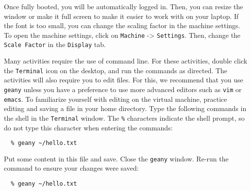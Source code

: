 \documentclass[11pt]{article}
\begin{document}
Once fully booted, you will be automatically logged in. Then, you can
resize the window or make it full screen to make it easier to work with
on your laptop. If the font is too small, you can change the scaling factor
in the machine settings. To open the machine settings, click on
\texttt{Machine} -> \texttt{Settings}. Then, change the \texttt{Scale Factor}
in the \texttt{Display} tab.

Many activities require the use of command line. For these
activities, double click the \texttt{Terminal} icon on the desktop, and run
the commands as directed. The activities will also require you to edit files.
For this, we recommend that you use \texttt{geany} unless you have a
preference to use more advanced editors such as \texttt{vim} or
\texttt{emacs}. To familiarize yourself with editing on the virtual machine,
practice editing and saving a file in your home directory. Type the
following commands in the shell in the \texttt{Terminal} window. The
\texttt{\%} characters indicate the shell prompt, so do not type this
character when entering the commands:

\vspace{-0.05in}
\begin{verbatim}
  % geany ~/hello.txt
\end{verbatim}
\vspace{-0.05in}

Put some content in this file and save. Close the \texttt{geany} window.
Re-run the command to ensure your changes were saved:

\vspace{-0.05in}
\begin{verbatim}
  % geany ~/hello.txt
\end{verbatim}
\vspace{-0.05in}
\end{document}

